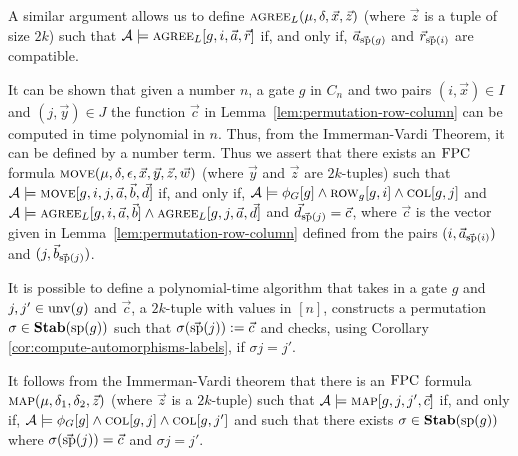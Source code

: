 \documentclass[../paper.tex]{subfiles}
\begin{document}

A similar argument allows us to define $\textsc{agree}_L (\mu, \delta , \vec{x},
\vec{z})$ (where $\vec{z}$ is a tuple of size $2k$) such that $\mathcal{A}
\models \textsc{agree}_L [g, i, \vec{a}, \vec{r}]$ if, and only if,
$\vec{a}_{\vec{\text{sp}}(g)}$ and $\vec{r}_{\vec{\text{sp}}(i)}$ are compatible.

It can be shown that given a number $n$, a gate $g$ in $C_n$ and two pairs $(i,
\vec{x}) \in I$ and $(j, \vec{y}) \in J$ the function $\vec{c}$ in
Lemma~\ref{lem:permutation-row-column} can be computed in time polynomial in
$n$. Thus, from the Immerman-Vardi Theorem, it can be defined by a number term.
Thus we assert that there exists an $\text{\upshape FPC}$ formula $\textsc{move} (\mu, \delta,
\epsilon, \vec{x}, \vec{y}, \vec{z}, \vec{w})$ (where $\vec{y}$ and $\vec{z}$
are $2k$-tuples) such that $\mathcal{A} \models \textsc{move} [g, i, j, \vec{a},
\vec{b}, \vec{d}]$ if, and only if, $\mathcal{A} \models \phi_G [g] \land
\textsc{row}_g[g,i] \land \textsc{col}[g, j]$ and $\mathcal{A} \models \textsc{agree}_L [g,
i, \vec{a}, \vec{b}] \land \textsc{agree}_L [g, j, \vec{a}, \vec{d}]$ and
$\vec{d}_{\vec{\text{sp}}(j)} = \vec{c}$, where $\vec{c}$ is the vector given in
Lemma~\ref{lem:permutation-row-column} defined from the pairs $(i,
\vec{a}_{\vec{\text{sp}}(i)})$ and $(j, \vec{b}_{\vec{\text{sp}}(j)})$.

It is possible to define a polynomial-time algorithm that takes in a gate $g$
and $j, j' \in \text{unv}(g)$ and $\vec{c}$, a $2k$-tuple with values in $[n]$,
constructs a permutation $\sigma \in \text{\textbf{Stab}} (\text{sp} (g))$ such that $\sigma
(\vec{\text{sp}}(j)) := \vec{c}$ and checks, using Corollary
\ref{cor:compute-automorphisms-labels}, if $\sigma j = j'$.

It follows from the Immerman-Vardi theorem that there is an $\text{\upshape FPC}$ formula
$\textsc{map}(\mu, \delta_1, \delta_2, \vec{z})$ (where $\vec{z}$ is a $2k$-tuple)
such that $\mathcal{A} \models \textsc{map}[g, j, j', \vec{c}]$ if, and only if,
$\mathcal{A} \models \phi_G [g] \land \textsc{col}[g, j] \land \textsc{col}[g, j']$ and
such that there exists $\sigma \in \text{\textbf{Stab}} (\text{sp} (g))$ where $\sigma (\vec{\text{sp}}(j)) =
\vec{c}$ and $\sigma j = j'$.
				
\end{document}
